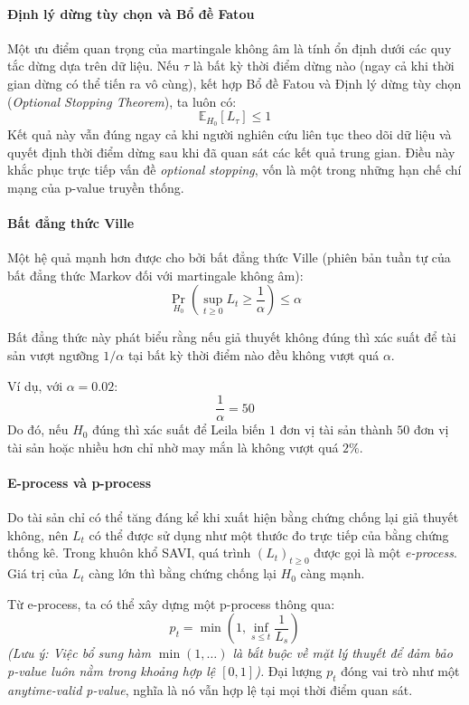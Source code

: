 \paragraph{Định lý dừng tùy chọn và Bổ đề Fatou}

Một ưu điểm quan trọng của martingale không âm là tính ổn định dưới các quy tắc dừng dựa trên dữ liệu. Nếu $\tau$ là bất kỳ thời điểm dừng nào (ngay cả khi thời gian dừng có thể tiến ra vô cùng), kết hợp Bổ đề Fatou và Định lý dừng tùy chọn (\textit{Optional Stopping Theorem}), ta luôn có:
\[
    \mathbb{E}_{H_0}[L_\tau] \leq 1
\]
Kết quả này vẫn đúng ngay cả khi người nghiên cứu liên tục theo dõi dữ liệu và quyết định thời điểm dừng sau khi đã quan sát các kết quả trung gian. Điều này khắc phục trực tiếp vấn đề \textit{optional stopping}, vốn là một trong những hạn chế chí mạng của p-value truyền thống.

\paragraph{Bất đẳng thức Ville}

Một hệ quả mạnh hơn được cho bởi bất đẳng thức Ville (phiên bản tuần tự của bất đẳng thức Markov đối với martingale không âm):
\[
    \Pr_{H_0} \left( \sup_{t\ge 0} L_t \ge \frac{1}{\alpha} \right) \le \alpha
\]

Bất đẳng thức này phát biểu rằng nếu giả thuyết không đúng thì xác suất để tài sản vượt ngưỡng $1/\alpha$ tại bất kỳ thời điểm nào đều không vượt quá $\alpha$.

Ví dụ, với $\alpha=0.02$:
\[
    \frac{1}{\alpha} = 50
\]
Do đó, nếu $H_0$ đúng thì xác suất để Leila biến $1$ đơn vị tài sản thành $50$ đơn vị tài sản hoặc nhiều hơn chỉ nhờ may mắn là không vượt quá $2\%$.

\paragraph{E-process và p-process}

Do tài sản chỉ có thể tăng đáng kể khi xuất hiện bằng chứng chống lại giả thuyết không, nên $L_t$ có thể được sử dụng như một thước đo trực tiếp của bằng chứng thống kê. Trong khuôn khổ SAVI, quá trình $(L_t)_{t\ge0}$ được gọi là một \textit{e-process}. Giá trị của $L_t$ càng lớn thì bằng chứng chống lại $H_0$ càng mạnh.

Từ e-process, ta có thể xây dựng một p-process thông qua:
\[
    p_t = \min\left(1, \inf_{s\le t} \frac{1}{L_s}\right)
\]
\textit{(Lưu ý: Việc bổ sung hàm $\min(1,\dots)$ là bắt buộc về mặt lý thuyết để đảm bảo p-value luôn nằm trong khoảng hợp lệ $[0,1]$).} Đại lượng $p_t$ đóng vai trò như một \textit{anytime-valid p-value}, nghĩa là nó vẫn hợp lệ tại mọi thời điểm quan sát.

